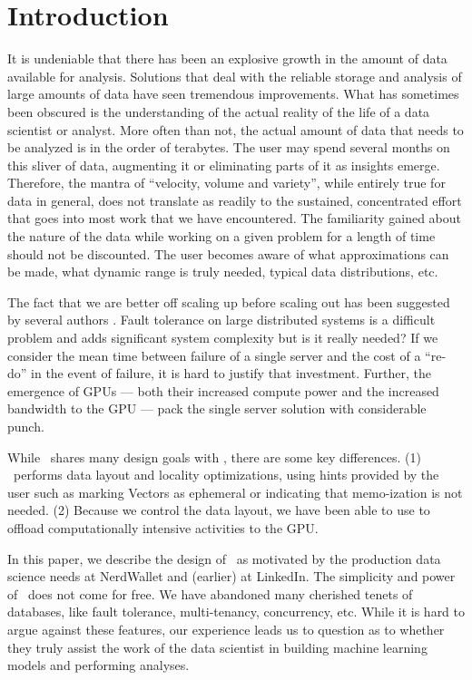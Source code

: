 \section{Introduction}

It is undeniable that there has been an explosive growth in the 
amount of data available for analysis. Solutions that 
deal with the reliable storage and analysis of large amounts of data have seen tremendous
improvements. What has sometimes been
obscured is the understanding of the actual reality of the life of a data
scientist or analyst. More often than not, the actual amount of data that needs
to be analyzed is in the order of terabytes\cite{Dittrich2015}. The user may spend
several months on this sliver of data, augmenting it or eliminating parts of it
as insights emerge. Therefore, the mantra of ``velocity, volume and variety'',
while entirely true for data in general, does not translate as readily to the
sustained, concentrated effort that goes into most work that we have
encountered. The familiarity gained about the nature of the data 
while working on a given problem for a length of time should not be discounted. The
user becomes aware of what approximations can be made, what dynamic range is
truly needed, typical data distributions, etc.

The fact that we are better off scaling up before scaling out has been suggested
by several authors \cite{Rowstron2012,Dittrich2015,McSherry2015,Kyrola2012}.
Fault tolerance on large distributed systems is a difficult
problem and adds significant system complexity but is it really needed?
If we consider the mean time between failure of a single server and
the cost of a ``re-do'' in the event of failure,
it is hard to justify that investment. 
Further, the emergence of GPUs --- both their increased compute power and the
increased  bandwidth to the GPU --- pack the single server solution with
considerable punch.

While \Q\ shares many design goals with \cite{Weld2017}, there are some key
differences. (1) \Q\ performs data layout and locality optimizations, 
using hints provided by the user such as marking Vectors as 
ephemeral or indicating that memo-ization is not needed. (2) Because we control
the data layout, we have been able to use \cite{UnifiedMemory2018} to offload
computationally intensive activities to the GPU.

In this paper, we describe the design of \Q\ as motivated by the 
production data science needs at NerdWallet and (earlier) at LinkedIn.
The simplicity and power of \Q\ does not come for free. We have abandoned many
cherished tenets of databases, like fault tolerance, multi-tenancy, concurrency,
etc. While it is hard to argue against these features, our experience leads us
to question as to whether they truly assist the work of the 
data scientist in building machine learning models and performing analyses.

